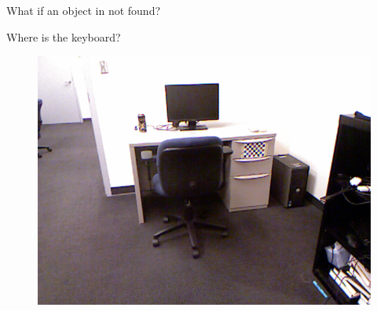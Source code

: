 \documentclass{beamer}
\begin{document}
\begin{frame}{What if an object in not found?}
\begin{center}
Where is the keyboard?
 \begin{figure}   
\includegraphics[width=0.9\linewidth]{contextorig.png}
 \end{figure}
 \end{center}
\end{frame}
\end{document}
